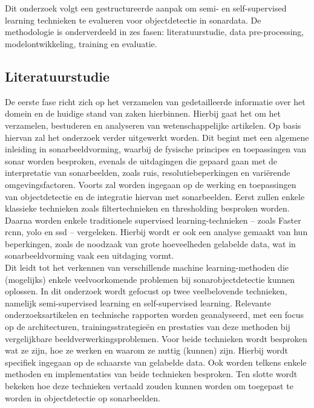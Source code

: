 
\chapter{}%
\label{ch:methodologie}

Dit onderzoek volgt een gestructureerde aanpak om semi- en self-supervised learning technieken te evalueren voor objectdetectie in sonardata. De methodologie is onderverdeeld in zes fasen: literatuurstudie, data pre-processing, modelontwikkeling, training en evaluatie.

\section{Literatuurstudie}

De eerste fase richt zich op het verzamelen van gedetailleerde informatie over het domein en de huidige stand van zaken hierbinnen. Hierbij gaat het om het verzamelen, bestuderen en analyseren van wetenschappelijke artikelen. Op basis hiervan zal het onderzoek verder uitgewerkt worden. Dit begint met een algemene inleiding in sonarbeeldvorming, waarbij de fysische principes en toepassingen van sonar worden besproken, evenals de uitdagingen die gepaard gaan met de interpretatie van sonarbeelden, zoals ruis, resolutiebeperkingen en variërende omgevingsfactoren. Voorts zal worden ingegaan op de werking en toepassingen van objectdetectie en de integratie hiervan met sonarbeelden. Eerst zullen enkele klassieke technieken zoals filtertechnieken en thresholding besproken worden. Daarna worden enkele traditionele supervised learning-technieken -- zoals Faster \gls{rcnn}, \gls{yolo} en \gls{ssd} -- vergeleken. Hierbij wordt er ook een analyse gemaakt van hun beperkingen, zoals de noodzaak van grote hoeveelheden gelabelde data, wat in sonarbeeldvorming vaak een uitdaging vormt. \\

Dit leidt tot het verkennen van verschillende machine learning-methoden die (mogelijks) enkele veelvoorkomende problemen bij sonarobjectdetectie kunnen oplossen. In dit onderzoek wordt gefocust op twee veelbelovende technieken, namelijk semi-supervised learning en self-supervised learning. Relevante onderzoeksartikelen en technische rapporten worden geanalyseerd, met een focus op de architecturen, trainingsstrategieën en prestaties van deze methoden bij vergelijkbare beeldverwerkingsproblemen. Voor beide technieken wordt besproken wat ze zijn, hoe ze werken en waarom ze nuttig (kunnen) zijn. Hierbij wordt specifiek ingegaan op de schaarste van gelabelde data. Ook worden telkens enkele methoden en implementaties van beide technieken besproken. Ten slotte wordt bekeken hoe deze technieken vertaald zouden kunnen worden om toegepast te worden in objectdetectie op sonarbeelden. \\

